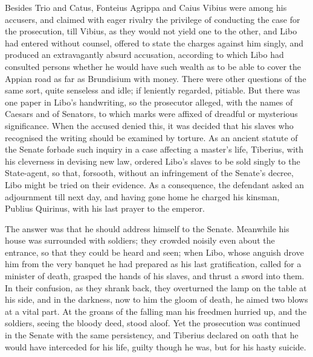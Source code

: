 
Besides Trio and Catus, Fonteius Agrippa and Caius Vibius were among his accusers, and claimed with eager rivalry the privilege of conducting the case for the prosecution, till Vibius, as they would not yield one to the other, and Libo had entered without counsel, offered to state the charges against him singly, and produced an extravagantly absurd accusation, according to which Libo had consulted persons whether he would have such wealth as to be able to cover the Appian road as far as Brundisium with money. There were other questions of the same sort, quite senseless and idle; if leniently regarded, pitiable. But there was one paper in Libo's handwriting, so the prosecutor alleged, with the names of Caesars and of Senators, to which marks were affixed of dreadful or mysterious significance. When the accused denied this, it was decided that his slaves who recognised the writing should be examined by torture. As an ancient statute of the Senate forbade such inquiry in a case affecting a master's life, Tiberius, with his cleverness in devising new law, ordered Libo's slaves to be sold singly to the State-agent, so that, forsooth, without an infringement of the Senate's decree, Libo might be tried on their evidence. As a consequence, the defendant asked an adjournment till next day, and having gone home he charged his kinsman, Publius Quirinus, with his last prayer to the emperor.


The answer was that he should address himself to the Senate. Meanwhile his house was surrounded with soldiers; they crowded noisily even about the entrance, so that they could be heard and seen; when Libo, whose anguish drove him from the very banquet he had prepared as his last gratification, called for a minister of death, grasped the hands of his slaves, and thrust a sword into them. In their confusion, as they shrank back, they overturned the lamp on the table at his side, and in the darkness, now to him the gloom of death, he aimed two blows at a vital part. At the groans of the falling man his freedmen hurried up, and the soldiers, seeing the bloody deed, stood aloof. Yet the prosecution was continued in the Senate with the same persistency, and Tiberius declared on oath that he would have interceded for his life, guilty though he was, but for his hasty suicide.


